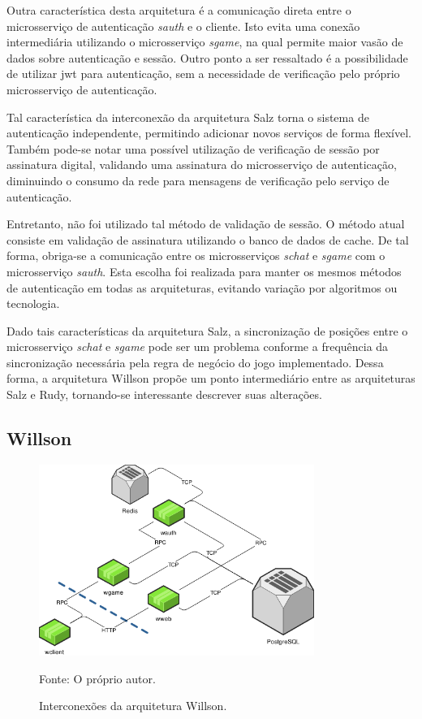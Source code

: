 Outra característica desta arquitetura é a comunicação direta entre o microsserviço de autenticação \textit{sauth} e o cliente.
%
Isto evita uma conexão intermediária utilizando o microsserviço \textit{sgame}, na qual permite maior vasão de dados sobre autenticação e sessão.
%
Outro ponto a ser ressaltado é a possibilidade de utilizar \ac{jwt} para autenticação, sem a necessidade de verificação pelo próprio microsserviço de autenticação.



Tal característica da interconexão da arquitetura Salz torna o sistema de autenticação independente, permitindo adicionar novos serviços de forma flexível.
%
Também pode-se notar uma possível utilização de verificação de sessão por assinatura digital, validando uma assinatura do microsserviço de autenticação, diminuindo o consumo da rede para mensagens de verificação pelo serviço de autenticação.



Entretanto, não foi utilizado tal método de validação de sessão.
%
O método atual consiste em validação de assinatura utilizando o banco de dados de cache.
%
De tal forma, obriga-se a comunicação entre os microsserviços \textit{schat} e \textit{sgame} com o microsserviço \textit{sauth}.
%
Esta escolha foi realizada para manter os mesmos métodos de autenticação em todas as arquiteturas, evitando variação por algoritmos ou tecnologia.



Dado tais características da arquitetura Salz, a sincronização de posições entre o microsserviço \textit{schat} e \textit{sgame} pode ser um problema conforme a frequência da sincronização necessária pela regra de negócio do jogo implementado.
%
Dessa forma, a arquitetura Willson propõe um ponto intermediário entre as arquiteturas Salz e Rudy, tornando-se interessante descrever suas alterações.



\subsection{Willson}
\label{sec:inter_willson}



\begin{figure}[htb!]
  \caption{Interconexões da arquitetura Willson.}
  \label{fig:interconexao_willson}
  \includegraphics[width=0.8\textwidth]{figuras/interconexoes/willson.png}
  \centering

  Fonte: O próprio autor.
\end{figure}
